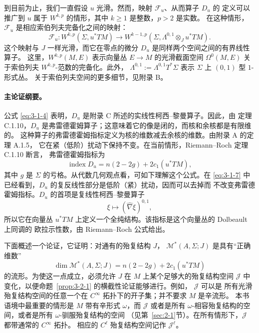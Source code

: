 到目前为止，我们一直假设 $u$ 光滑。然而，映射 $\mathcal F_u$、从而算子 $D_u$ 的
定义可以推广到 $u$ 属于 $W^{k,p}$ 的情形，其中 $k\ge1$ 是整数，$p>2$ 是实数。
在这种情形，$\mathcal F_u$ 是相应索伯列夫完备化之间的映射：
\[
  \mathcal F_u:
  W^{k,p}(\Sigma,u^*TM)
  \longrightarrow
  W^{k-1,p}(\Sigma,\Lambda^{0,1}\otimes_Ju^*TM).
\]
这个映射与 $J$ 一样光滑，而它在零点的微分 $D_u$ 是同样两个空间之间的有界线性算子。
这里，$W^{k,p}(M,E)$ 表示向量丛 $E\to M$ 的光滑截面空间
$\Omega^0(M,E)$ 关于索伯列夫 $W^{k,p}$-范数的完备化。此外，
$\Lambda^{0,1}:=\Lambda^{0,1}T^*\Sigma$ 表示 $\Sigma$ 上 $(0,1)$ 型 $1$-形式丛。
关于索伯列夫空间的更多细节，见附录 B。

\paragraph{主论证纲要。}
公式 \eqref{eq:3-1-4} 表明，$D_u$ 是附录 C 所述的实线性柯西--黎曼算子。因此，由
定理 C.1.10，$D_u$ 是弗雷德霍姆算子；这意味着它的像是闭的，而核和余核都是有限维的。
这种算子的弗雷德霍姆指标定义为核的维数减去余核的维数。由附录 A 的定理 A.1.5，
它在紧（低阶）扰动下保持不变。在当前情形，Riemann--Roch 定理 C.1.10 断言，
弗雷德霍姆指标为
\[
  \operatorname{index}D_u
  =n(2-2g)+2c_1(u^*TM),
\]
其中 $g$ 是 $\Sigma$ 的亏格。从代数几何观点看，可如下理解这个公式。在
\eqref{eq:3-1-7} 中已经看到，$D_u$ 的复反线性部分是低阶（紧）扰动，因而可以去掉而
不改变弗雷德霍姆指标。$D_u$ 的首项是复线性柯西--黎曼算子
\[
  \xi\longmapsto(\widehat\nabla\xi)^{0,1},
\]
所以它在向量丛 $u^*TM$ 上定义一个全纯结构。该指标是这个向量丛的 Dolbeault 上同调的
欧拉示性数，由 Riemann--Roch 公式给出。

下面概述一个论证，它证明：对通有的殆复结构 $J$，
$\mathcal M^*(A,\Sigma;J)$ 是具有“正确维数”
\[
  \dim\mathcal M^*(A,\Sigma;J)
  =n(2-2g)+2c_1(u^*TM)
\]
的流形。为使这一点成立，必须允许 $J$ 在 $M$ 上某个足够大的殆复结构空间
$\mathcal J$ 中变化，以便命题~\ref{prop:3-2-1} 的横截性论证能够进行。例如，
$\mathcal J$ 可以是
所有光滑殆复结构空间的任意一个在 $C^\infty$ 拓扑下的开子集；并不要求 $M$ 是辛流形。
本书语境中最重要的情形是 $M$ 带有辛形式 $\omega$，而 $\mathcal J$ 或者是所有
$\omega$-相容殆复结构的空间，或者是所有 $\omega$-驯服殆复结构的空间
（见第~\ref{sec:2-1}节）。在所有情形下，$\mathcal J$ 都带通常的 $C^\infty$ 拓扑。
相应的 $C^\ell$ 殆复结构空间记作 $\mathcal J^\ell$。

